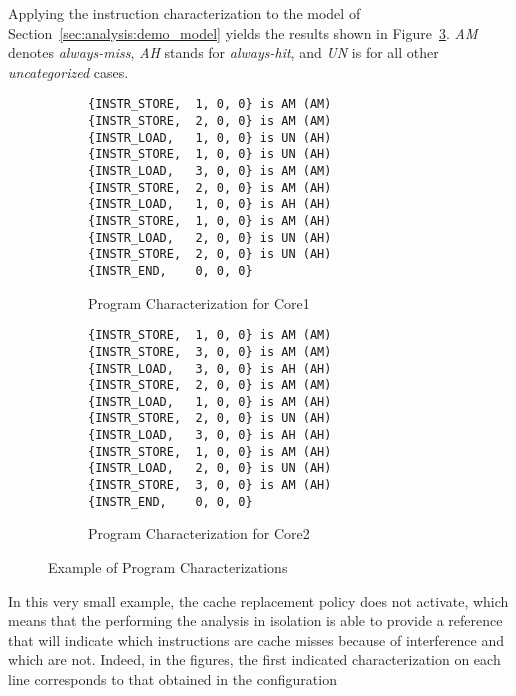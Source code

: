\begin{example}
\label{ex:analysis:instr_chara}
Applying the instruction characterization to the model of
Section~\ref{sec:analysis:demo_model} yields the results shown in
Figure~\ref{fig:analysis:demo_chara_progs}. \textit{AM} denotes
\textit{always-miss}, \textit{AH} stands for \textit{always-hit}, and
\textit{UN} is for all other \textit{uncategorized} cases.
\begin{figure}[hbt!]
\begin{center}
\begin{subfigure}[t]{0.45\textwidth}
\centering
\begin{lstlisting}
{INSTR_STORE,  1, 0, 0} is AM (AM)
{INSTR_STORE,  2, 0, 0} is AM (AM)
{INSTR_LOAD,   1, 0, 0} is UN (AH)
{INSTR_STORE,  1, 0, 0} is UN (AH)
{INSTR_LOAD,   3, 0, 0} is AM (AM)
{INSTR_STORE,  2, 0, 0} is AM (AH)
{INSTR_LOAD,   1, 0, 0} is AH (AH)
{INSTR_STORE,  1, 0, 0} is AM (AH)
{INSTR_LOAD,   2, 0, 0} is UN (AH)
{INSTR_STORE,  2, 0, 0} is UN (AH)
{INSTR_END,    0, 0, 0}
\end{lstlisting}
\caption{Program Characterization for Core1}
\label{fig:analysis:demo_chara_prog1}
\end{subfigure}
\begin{subfigure}[t]{0.45\textwidth}
\centering
\begin{lstlisting}
{INSTR_STORE,  1, 0, 0} is AM (AM)
{INSTR_STORE,  3, 0, 0} is AM (AM)
{INSTR_LOAD,   3, 0, 0} is AH (AH)
{INSTR_STORE,  2, 0, 0} is AM (AM)
{INSTR_LOAD,   1, 0, 0} is AM (AH)
{INSTR_STORE,  2, 0, 0} is UN (AH)
{INSTR_LOAD,   3, 0, 0} is AH (AH)
{INSTR_STORE,  1, 0, 0} is AM (AH)
{INSTR_LOAD,   2, 0, 0} is UN (AH)
{INSTR_STORE,  3, 0, 0} is AM (AH)
{INSTR_END,    0, 0, 0}
\end{lstlisting}
\caption{Program Characterization for Core2}
\label{fig:analysis:demo_chara_prog2}
\end{subfigure}
\end{center}
\caption{Example of Program Characterizations}
\label{fig:analysis:demo_chara_progs}
\end{figure}
In this very small example, the cache replacement policy does not activate,
which means that the performing the analysis in isolation is able to provide a
reference that will indicate which instructions are cache misses because of
interference and which are not. Indeed, in the figures, the first indicated
characterization on each line corresponds to that obtained in the configuration

\end{example}
